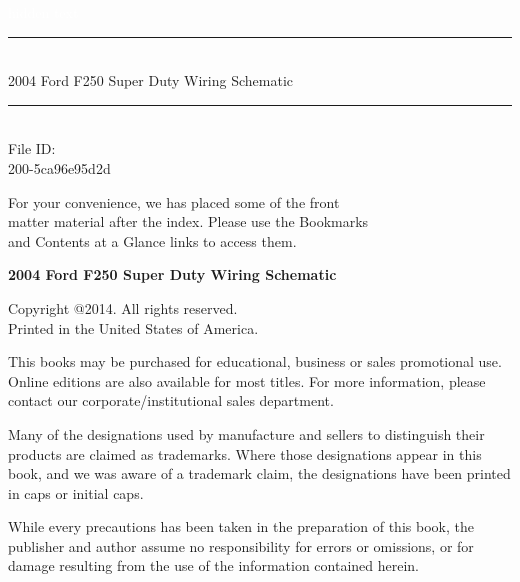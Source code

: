 \documentclass{article}
\newcommand{\HRule}{\rule{\linewidth}{2mm}}
\begin{document}
\begin{titlepage}

\begin{flushright}
\textcolor{white}{hidden text}

\vspace{7cm}

\HRule \\[0.4cm]
{\large 2004 Ford F250 Super Duty Wiring Schematic }\\[0.4cm]
\HRule \\[1.5cm]

\large{File ID:}\\
\small{ 200-5ca96e95d2d }

\end{flushright}

\vfill

\begin{flushright}
\footnotesize{ For your convenience, we has placed some of the front \\
matter material after the index. Please use the Bookmarks \\
and Contents at a Glance links to access them. }
\end{flushright}

\end{titlepage}
\noindent
{\textbf {\footnotesize 2004 Ford F250 Super Duty Wiring Schematic }}

\vspace{6pt}

\noindent
\scriptsize{Copyright @2014. All rights reserved. \\Printed in the United
  States of America.}

\noindent
\scriptsize{This books may be purchased for educational, business or
  sales promotional use. Online editions are also available for most
  titles. For more information, please contact our
  corporate/institutional sales department.}

\vfill

\noindent
\scriptsize{Many of the designations used by manufacture and sellers
  to distinguish their products are claimed as trademarks. Where those
  designations appear in this book, and we was aware of a trademark
  claim, the designations have been printed in caps or initial caps.}

\noindent
\scriptsize{While every precautions has been taken in the preparation of
  this book, the publisher and author assume no responsibility for
  errors or omissions, or for damage resulting from the use of the
  information contained herein.}
\end{document}
